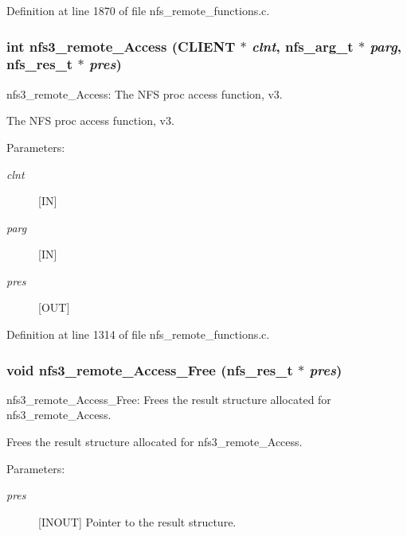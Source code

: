 Definition at line 1870 of file nfs\_\-remote\_\-functions.c.
\subsubsection[{nfs3\_\-remote\_\-Access}]{\setlength{\rightskip}{0pt plus 5cm}int nfs3\_\-remote\_\-Access (CLIENT $\ast$ {\em clnt}, \/  nfs\_\-arg\_\-t $\ast$ {\em parg}, \/  nfs\_\-res\_\-t $\ast$ {\em pres})}\label{group__NFSprocs_g44edf748249f381fca07b030136fc81e}


nfs3\_\-remote\_\-Access: The NFS proc access function, v3.

The NFS proc access function, v3.

\begin{Desc}
\item[Parameters:]
\begin{description}
\item[{\em clnt}][IN] \item[{\em parg}][IN] \item[{\em pres}][OUT] \end{description}
\end{Desc}


Definition at line 1314 of file nfs\_\-remote\_\-functions.c.
\subsubsection[{nfs3\_\-remote\_\-Access\_\-Free}]{\setlength{\rightskip}{0pt plus 5cm}void nfs3\_\-remote\_\-Access\_\-Free (nfs\_\-res\_\-t $\ast$ {\em pres})}\label{group__NFSprocs_gd07a84ff71227f3f26103c78a39b1225}


nfs3\_\-remote\_\-Access\_\-Free: Frees the result structure allocated for nfs3\_\-remote\_\-Access.

Frees the result structure allocated for nfs3\_\-remote\_\-Access.

\begin{Desc}
\item[Parameters:]
\begin{description}
\item[{\em pres}][INOUT] Pointer to the result structure. \end{description}
\end{Desc}


